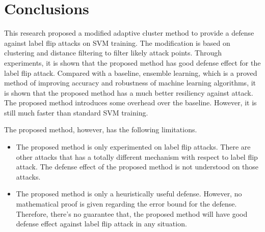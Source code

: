 \documentclass[10pt,conference,compsocconf,letterpaper]{IEEEtran}
\begin{document}
\section{Conclusions}

This research proposed a modified adaptive cluster method to provide a defense against label flip attacks on SVM training. The modification is based on clustering and distance filtering to filter likely attack points. Through experiments, it is shown that the proposed method has good defense effect for the label flip attack. Compared with a baseline, ensemble learning, which is a proved method of improving accuracy and robustness of machine learning algorithms, it is shown that the proposed method has a much better resiliency against attack. The proposed method introduces some overhead over the baseline. However, it is still much faster than standard SVM training.

The proposed method, however, has the following limitations. 

\begin{itemize}
\item The proposed method is only experimented on label flip attacks. There are other attacks that has a totally different mechanism with respect to label flip attack. The defense effect of the proposed method is not understood on those attacks.
\item The proposed method is only a heuristically useful defense. However, no mathematical proof is given regarding the error bound for the defense. Therefore, there's no guarantee that, the proposed method will have good defense effect against label flip attack in any situation. 
\end{itemize} 
\end{document}
